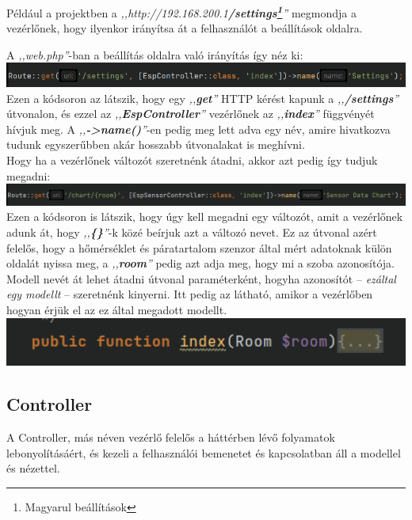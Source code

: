 \documentclass[
]{thesis-ekf}
\theoremstyle{definition}
\theoremstyle{remark}
\begin{document}
	Például a projektben a \emph{,,http://192.168.200.1\textbf{/settings\footnote{Magyarul beállítások}}''} megmondja a vezérlőnek, hogy ilyenkor irányítsa át a felhasználót a beállítások oldalra.
	
	A \emph{,,web.php''}-ban a beállítás oldalra való irányítás így néz ki:
	\\
	\includegraphics[width=1\textwidth]{./src/codes/route}
	\\
	Ezen a kódsoron az látszik, hogy egy \emph{,,\textbf{get}''} HTTP kérést kapunk a \emph{,,\textbf{/settings}''} útvonalon, és ezzel az \emph{,,\textbf{EspController}''} vezérlőnek az \emph{,,\textbf{index}''} függvényét hívjuk meg. A \emph{,,\textbf{->name()}''}-en pedig meg lett adva egy név, amire hivatkozva tudunk egyszerűbben akár hosszabb útvonalakat is meghívni.
	\\
	Hogy ha a vezérlőnek változót szeretnénk átadni, akkor azt pedig így tudjuk megadni:
	\\
	\includegraphics[width=1\textwidth]{./src/codes/route_with_var}
	Ezen a kódsoron is látszik, hogy úgy kell megadni egy változót, amit a vezérlőnek adunk át, hogy \emph{,,\textbf{\{\}}''}-k közé beírjuk azt a változó nevet. Ez az útvonal azért felelős, hogy a hőmérséklet és páratartalom szenzor által mért adatoknak külön oldalát nyissa meg, a \emph{,,\textbf{room}''} pedig azt adja meg, hogy mi a szoba azonosítója. Modell nevét át lehet átadni útvonal paraméterként, hogyha azonosítót -- \emph{ezáltal egy modellt} -- szeretnénk kinyerni.
	Itt pedig az látható, amikor a vezérlőben hogyan érjük el az ez által megadott modellt.
	\\
	\includegraphics[width=1\textwidth]{./src/codes/controller_func}
	
	\subsection{Controller}
	A Controller, más néven vezérlő felelős a háttérben lévő folyamatok lebonyolításáért, és kezeli a felhasználói bemenetet és kapcsolatban áll a modellel és nézettel.
	
\end{document}
